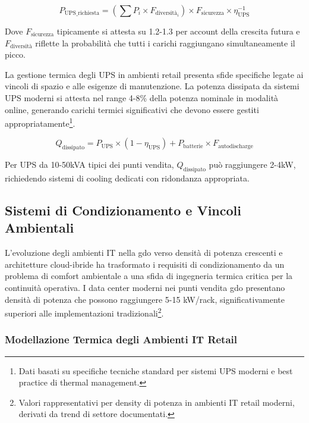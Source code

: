 \begin{equation}
P_{\text{UPS\_richiesta}} = \left(\sum P_i \times F_{\text{diversità}_i}\right) \times F_{\text{sicurezza}} \times \eta_{\text{UPS}}^{-1}
\label{eq:dimensionamento-ups}
\end{equation}

Dove $F_{\text{sicurezza}}$ tipicamente si attesta su 1.2-1.3 per account della crescita futura e $F_{\text{diversità}}$ riflette la probabilità che tutti i carichi raggiungano simultaneamente il picco.

La gestione termica degli UPS in ambienti retail presenta sfide specifiche legate ai vincoli di spazio e alle esigenze di manutenzione. La potenza dissipata da sistemi UPS moderni si attesta nel range 4-8\% della potenza nominale in modalità online, generando carichi termici significativi che devono essere gestiti appropriatamente\footnote{Dati basati su specifiche tecniche standard per sistemi UPS moderni e best practice di thermal management.}.

\begin{equation}
Q_{\text{dissipato}} = P_{\text{UPS}} \times (1 - \eta_{\text{UPS}}) + P_{\text{batterie}} \times F_{\text{autodischarge}}
\label{eq:calore-dissipato}
\end{equation}

Per UPS da 10-50kVA tipici dei punti vendita, $Q_{\text{dissipato}}$ può raggiungere 2-4kW, richiedendo sistemi di cooling dedicati con ridondanza appropriata.

\subsection{Sistemi di Condizionamento e Vincoli Ambientali}
\label{subsec:condizionamento-ambientale}

L'evoluzione degli ambienti IT nella \gls{gdo} verso densità di potenza crescenti e architetture cloud-ibride ha trasformato i requisiti di condizionamento da un problema di comfort ambientale a una sfida di ingegneria termica critica per la continuità operativa. I data center moderni nei punti vendita \gls{gdo} presentano densità di potenza che possono raggiungere 5-15 kW/rack, significativamente superiori alle implementazioni tradizionali\footnote{Valori rappresentativi per density di potenza in ambienti IT retail moderni, derivati da trend di settore documentati.}.

\subsubsection{Modellazione Termica degli Ambienti IT Retail}

